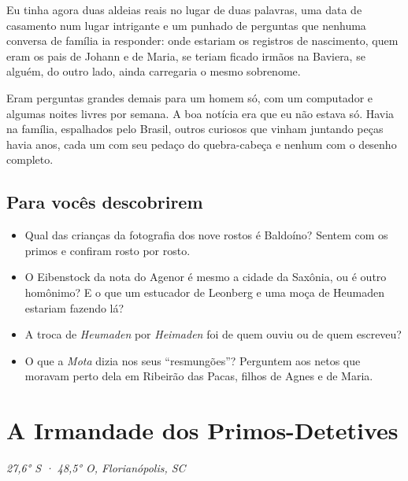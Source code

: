 \documentclass[
  brazilian,
  11pt,
  openany]{book}
\providecommand{\tightlist}{%
  \setlength{\itemsep}{0pt}\setlength{\parskip}{0pt}}
\begin{document}
Eu tinha agora duas aldeias reais no lugar de duas palavras, uma data de
casamento num lugar intrigante e um punhado de perguntas que nenhuma
conversa de família ia responder: onde estariam os registros de
nascimento, quem eram os pais de Johann e de Maria, se teriam ficado
irmãos na Baviera, se alguém, do outro lado, ainda carregaria o mesmo
sobrenome.

Eram perguntas grandes demais para um homem só, com um computador e
algumas noites livres por semana. A boa notícia era que eu não estava
só. Havia na família, espalhados pelo Brasil, outros curiosos que vinham
juntando peças havia anos, cada um com seu pedaço do quebra-cabeça e
nenhum com o desenho completo.

\section{Para vocês descobrirem}\label{para-vocuxeas-descobrirem-1}

\begin{itemize}
\tightlist
\item
  Qual das crianças da fotografia dos nove rostos é Baldoíno? Sentem com
  os primos e confiram rosto por rosto.
\item
  O Eibenstock da nota do Agenor é mesmo a cidade da Saxônia, ou é outro
  homônimo? E o que um estucador de Leonberg e uma moça de Heumaden
  estariam fazendo lá?
\item
  A troca de \emph{Heumaden} por \emph{Heimaden} foi de quem ouviu ou de
  quem escreveu?
\item
  O que a \emph{Mota} dizia nos seus ``resmungões''? Perguntem aos netos
  que moravam perto dela em Ribeirão das Pacas, filhos de Agnes e de
  Maria.
\end{itemize}

\chapter{A Irmandade dos Primos-Detetives}\label{cap-3}

\emph{27,6° S · 48,5° O, Florianópolis, SC}
\end{document}
